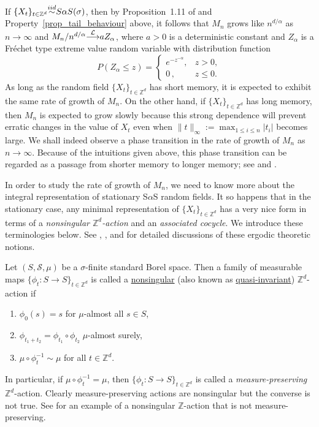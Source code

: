 \documentclass[12pt]{amsart}
\begin{document}
If $\{X_t\}_{t \in {\mathbb{Z}^d} }{\stackrel{\footnotesize{iid}}{\sim}} S\alpha S(\sigma)$, then by Proposition~1.11 of \cite{resnick:1987} and Property~\ref{prop_tail_behaviour} above, it follows that $M_n$ grows like $n^{d/\alpha}$ as $n \to \infty$ and $M_n/n^{d/\alpha} {\stackrel{\footnotesize{\mathcal{L}}}{\longrightarrow}} a Z_\alpha$, where $a>0$ is a deterministic constant and $Z_\alpha$ is a Fr\'{e}chet type extreme value random variable with distribution function
\begin{equation}
P(Z_\alpha \leq z) =
\left\{
\begin{array}{ll}
e^{-z^{-\alpha}},& z>0,\\
0\,,                         & z \leq 0.
\end{array}
\right. \label{form_of_cdf_of_Zalpha}
\end{equation}
As long as the random field ${\{X_t\}_{t \in \mathbb{Z}^d}}$ has short memory, it is expected to exhibit the same rate of growth of $M_n$. On the other hand, if ${\{X_t\}_{t \in \mathbb{Z}^d}}$ has long memory, then $M_n$ is expected to grow slowly because this strong dependence will prevent erratic changes in the value of $X_t$ even when $\|t\|_\infty:=\max_{1 \leq i \leq n} |t_i|$ becomes large. We shall indeed observe a phase transition in the rate of growth of $M_n$ as $n \to \infty$. Because of the intuitions given above, this phase transition can be regarded as a passage from shorter memory to longer memory; see \cite{samorodnitsky:2004a} and \cite{roy:samorodnitsky:2008}.

In order to study the rate of growth of $M_n$, we need to know more about the integral representation of stationary S$\alpha$S random fields. It so happens that in the stationary case, any minimal representation of ${\{X_t\}_{t \in \mathbb{Z}^d}}$ has a very nice form in terms of a \emph{nonsingular ${\mathbb{Z}^d}$-action} and an \emph{associated cocycle}. We introduce these terminologies below. See \cite{varadarajan:1970}, \cite{zimmer:1984}, \cite{krengel:1985} and \cite{aaronson:1997} for detailed discussions of these ergodic theoretic notions.

\begin{defn} Let $(S, \mathcal{S}, \mu)$ be a $\sigma$-finite standard Borel space. Then a family of measurable maps $\{\phi_t:S \to S\}_{t \in {\mathbb{Z}^d}}$ is called a \underline{nonsingular} (also known as \underline{quasi-invariant}) ${\mathbb{Z}^d}$-action if
\begin{enumerate}
\item $\phi_0(s)=s$ for $\mu$-almost all $s \in S$,
\item $\phi_{t_1+t_2} = \phi_{t_1} \circ \phi_{t_2}\;\mu$-almost surely,
\item $\mu \circ \phi_t^{-1} \sim \mu$  for all $t \in {\mathbb{Z}^d}$.
\end{enumerate}
\end{defn}
\noindent In particular, if $\mu \circ \phi_t^{-1} = \mu$, then $\{\phi_t:S \to S\}_{t \in {\mathbb{Z}^d}}$ is called a \emph{measure-preserving} ${\mathbb{Z}^d}$-action. Clearly measure-preserving actions are nonsingular but the converse is not true. See \cite{aaronson:1997} for an example of a nonsingular $\mathbb{Z}$-action that is not measure-preserving.
\end{document}
